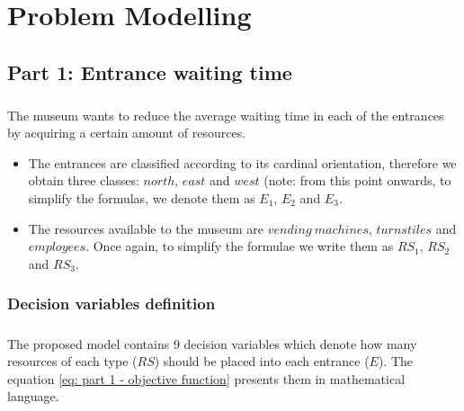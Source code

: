 \chapter{Problem Modelling}
\label{chapter: problem modelling}









\section{Part 1: Entrance waiting time}

\paragraph{}
The museum wants to reduce the average waiting time in each of the entrances by acquiring a certain amount of resources.

\begin{itemize}
    \item The entrances are classified according to its cardinal orientation, therefore we obtain three classes: $north$, $east$ and $west$ (note: from this point onwards, to simplify the formulas, we denote them as $E_1$, $E_2$ and $E_3$.
    
    \item The resources available to the museum are $vending\ machines$, $turnstiles$ and $employees$. Once again, to simplify the formulae we write them as $RS_1$, $RS_2$ and $RS_3$.
\end{itemize}








\subsection{Decision variables definition}

\paragraph{}
The proposed model contains 9 decision variables which denote how many resources of each type ($RS$) should be placed into each entrance ($E$). The equation  \ref{eq: part 1 - objective function}  presents them in mathematical language.

